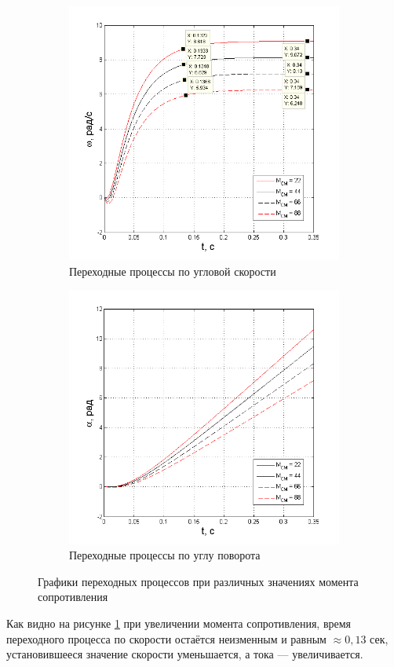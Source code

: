 \documentclass[fleqn, a4paper, 11pt, russian]{article}
\begin{document}
	\begin{figure}[ht!]\ContinuedFloat
		\centering
		\begin{subfigure}[b]{0.49\textwidth}
			\includegraphics[width = \textwidth]{MvarOmega}
			\caption{Переходные процессы по угловой скорости}
		\end{subfigure}
		\hfill
		\begin{subfigure}[b]{0.49\textwidth}
			\includegraphics[width = \textwidth]{MvarAlpha}
			\caption{Переходные процессы по углу поворота}
		\end{subfigure}
		\caption{Графики переходных процессов при различных значениях момента сопротивления}
		\label{MVar}
	\end{figure}
	Как видно на рисунке \ref{MVar} при увеличении момента сопротивления, время переходного процесса по скорости остаётся неизменным и равным $\approx0,13$ сек, установившееся значение скорости уменьшается, а тока --- увеличивается.
	\clearpage
\end{document}
